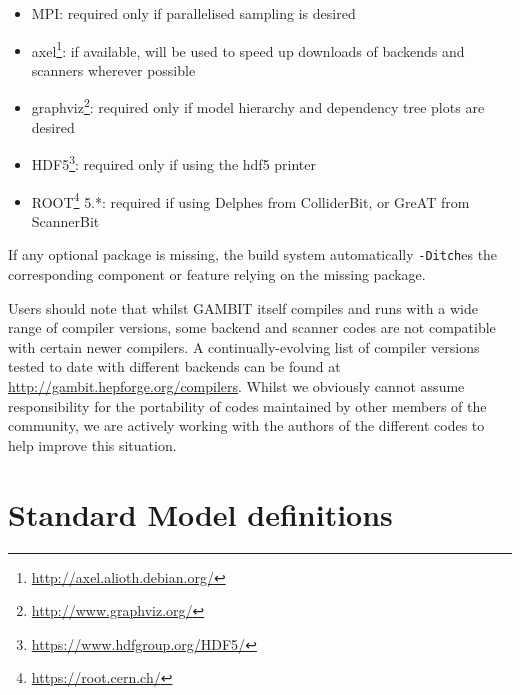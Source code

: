 \documentclass[pdftex,twocolumn,epjc3_preprint,runningheads]{svjour3}
\renewcommand{\_}{\discretionary{\underscore}{}{\underscore}}
\newcommand\term[1]{{\lstset{style=terminal}\lstinline!#1!\lstset{style=cpp}}}
\newcommand{\gambit}{\textsf{GAMBIT}\xspace}
\newcommand{\colliderbit}{\textsf{ColliderBit}\xspace}
\newcommand{\scannerbit}{\textsf{ScannerBit}\xspace}
\newcommand{\GB}{\gambit}
\newcommand{\mpi}{\textsf{MPI}\xspace}
\renewcommand{\url}[1]{\href{#1}{#1}}
\begin{document}
\begin{itemize}
	\item \mpi: required only if parallelised sampling is desired
  \item \textsf{axel}\footnote{\url{http://axel.alioth.debian.org/}}: if available, will be used to speed up downloads of backends and scanners wherever possible
  \item \textsf{graphviz}\footnote{\url{http://www.graphviz.org/}}: required only if model hierarchy and dependency tree plots are desired
	\item \textsf{HDF5}\footnote{\url{https://www.hdfgroup.org/HDF5/}}: required only if using the \textsf{hdf5} printer
	\item \textsf{ROOT}\footnote{\url{https://root.cern.ch/}} \textsf{5.*}: required if using \textsf{Delphes} from \colliderbit, or \textsf{GreAT} from \scannerbit
\end{itemize}
If any optional package is missing, the build system automatically \term{-Ditch}es the corresponding component or feature relying on the missing package.

Users should note that whilst \GB itself compiles and runs with a wide range of compiler versions, some backend and scanner codes are not compatible with certain newer compilers.  A continually-evolving list of compiler versions tested to date with different backends can be found at \url{http://gambit.hepforge.org/compilers}.  Whilst we obviously cannot assume responsibility for the portability of codes maintained by other members of the community, we are actively working with the authors of the different codes to help improve this situation.

\section{Standard Model definitions}
\label{SMdefs}
\end{document}
